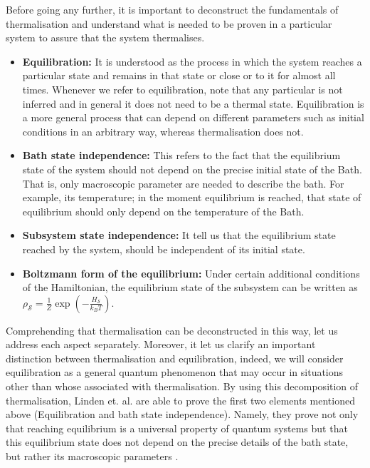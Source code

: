 \indent Before going any further, it is important to deconstruct the fundamentals of thermalisation  and understand what is needed to be proven in a particular system to assure that the system thermalises\cite{linden_quantum_2009}. 
\begin{itemize}
\item \textbf{Equilibration:} It is understood as the process in which the system reaches a particular state and remains in that state or close or to it for almost all times. Whenever we refer to equilibration, note that any particular is not inferred and in general it does not need to be a thermal state. Equilibration is a more general process that can depend on different parameters such as initial conditions in an arbitrary way, whereas thermalisation does not.
\item \textbf{Bath state independence:} This refers to the fact that the equilibrium state of the system should not depend on the precise initial state of the Bath. That is, only macroscopic parameter are needed to describe the bath. For example, its temperature; in the moment equilibrium is reached, that state of equilibrium should only depend on the temperature of the Bath.
\item\textbf{Subsystem state independence:} It tell us that the equilibrium state reached by the system, should be independent of its initial state. 
\item \textbf{Boltzmann form of the equilibrium:} Under certain additional conditions of the Hamiltonian, the equilibrium state of the subsystem can be written as $\rho_{\mathcal{S}}=\frac{1}{Z}\operatorname{exp}(-\frac{H_{\mathcal{S}}}{k_B T})$.
\end{itemize}

\indent Comprehending that thermalisation can be deconstructed in this way, let us address each aspect separately. Moreover, it let us clarify an important distinction between thermalisation and equilibration, indeed, we will consider equilibration as a general quantum phenomenon that may occur in situations other than whose associated with thermalisation. By using this decomposition of thermalisation, Linden et. al. are able to prove the first two elements mentioned above (Equilibration and bath state independence). Namely, they prove not only that reaching equilibrium is a universal property of quantum systems but that this equilibrium state does not depend on the precise details of the bath state, but rather its macroscopic parameters \cite{linden_quantum_2009}.\\





